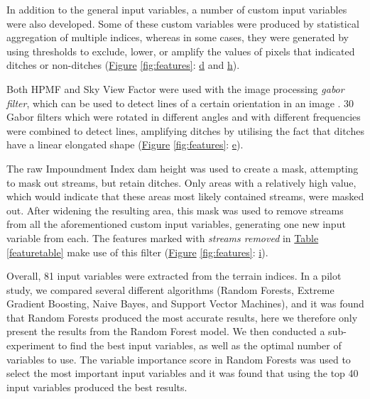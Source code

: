 \documentclass[]{interact}
\theoremstyle{plain}%
\theoremstyle{definition}
\theoremstyle{remark}
\begin{document}
In addition to the general input variables, a number of custom input variables were also developed.  Some of these custom variables were produced by statistical aggregation of multiple indices, whereas in some cases, they were generated by using thresholds to exclude, lower, or amplify the values of pixels that indicated ditches or non-ditches (\hyperref[fig:features]{Figure} \ref{fig:features}: \hyperref[fig:features]{d} and \hyperref[fig:features]{h}).

Both HPMF and Sky View Factor were used with the image processing \textit{gabor filter}, which can be used to detect lines of a certain orientation in an image \citep{gabor}. 30 Gabor filters which were rotated in different angles and with different frequencies were combined to detect lines, amplifying ditches by utilising the fact that ditches have a linear elongated shape (\hyperref[fig:features]{Figure} \ref{fig:features}: \hyperref[fig:features]{e}).

\label{impoundmentstreamremoval}
The raw Impoundment Index dam height was used to create a mask, attempting to mask out streams, but retain ditches. Only areas with a relatively high value, which would indicate that these areas most likely contained streams, were masked out. After widening the resulting area, this mask was used to remove streams from all the aforementioned custom input variables, generating one new input variable from each. The features marked with \textit{streams removed} in \hyperref[featuretable]{Table} \ref{featuretable} make use of this filter (\hyperref[fig:features]{Figure} \ref{fig:features}: \hyperref[fig:features]{i}).

Overall, 81 input variables were extracted from the terrain indices. In a pilot study, we compared several different algorithms (Random Forests, Extreme Gradient Boosting, Naive Bayes, and Support Vector Machines), and it was found that Random Forests produced the most accurate results, here we therefore only present the results from the Random Forest model. We then conducted a sub-experiment to find the best input variables, as well as the optimal number of variables to use. The variable importance score in Random Forests was used to select the most important input variables and it was found that using the top 40 input variables produced the best results.
\end{document}
